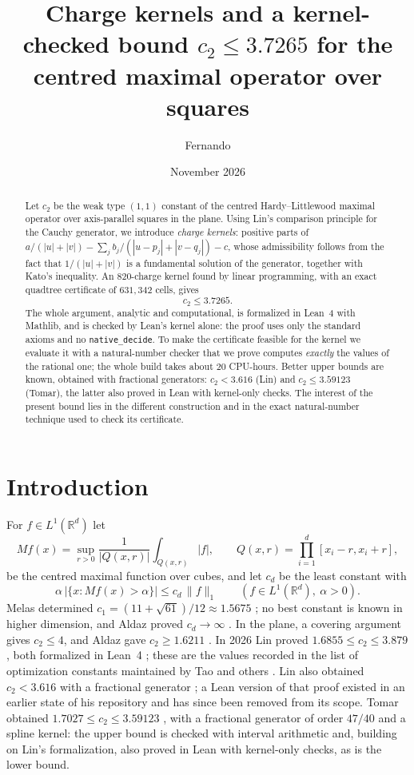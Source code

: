 \documentclass[11pt]{amsart}
\title[A kernel-checked bound for the planar centred maximal constant]{Charge kernels and a kernel-checked
bound $c_2 \le 3.7265$ for the centred maximal operator over squares}
\author{Fernando}
\date{November 2026}
\theoremstyle{definition}
\theoremstyle{remark}
\newcommand{\R}{\mathbb{R}}
\newcommand{\lean}[1]{\texttt{#1}}
\begin{document}
\begin{abstract}
Let $c_2$ be the weak type $(1,1)$ constant of the centred Hardy--Littlewood maximal operator
over axis-parallel squares in the plane. Using Lin's comparison principle for the Cauchy
generator, we introduce \emph{charge kernels}: positive parts of $a/(|u|+|v|) - \sum_j b_j /
(|u-p_j|+|v-q_j|) - c$, whose admissibility follows from the fact that $1/(|u|+|v|)$ is a
fundamental solution of the generator, together with Kato's inequality. An $820$-charge kernel
found by linear programming, with an exact quadtree certificate of $631{,}342$ cells, gives
\[ c_2 \le 3.7265 . \]
The whole argument, analytic and computational, is formalized in Lean~4 with Mathlib, and is
checked by Lean's kernel alone: the proof uses only the standard axioms and no
\lean{native\_decide}. To make the certificate feasible for the kernel we evaluate it with a
natural-number checker that we prove computes \emph{exactly} the values of the rational one; the whole
build takes about $20$ CPU-hours. Better upper bounds are known, obtained with fractional generators:
$c_2 < 3.616$ (Lin) and $c_2 \le 3.59123$ (Tomar), the latter also proved in Lean with kernel-only
checks. The interest of the present bound lies in the different construction and in the exact
natural-number technique used to check its certificate.
\end{abstract}

\maketitle

\section{Introduction}

For $f \in L^1(\R^d)$ let
\[ Mf(x) = \sup_{r>0} \frac{1}{|Q(x,r)|} \int_{Q(x,r)} |f|, \qquad Q(x,r) = \prod_{i=1}^d [x_i - r, x_i + r], \]
be the centred maximal function over cubes, and let $c_d$ be the least constant with
\[ \alpha\, \bigl|\{ x : Mf(x) > \alpha \}\bigr| \le c_d \, \|f\|_1 \qquad (f \in L^1(\R^d),\ \alpha > 0). \]
Melas determined $c_1 = (11+\sqrt{61})/12 \approx 1.5675$ \cite{Melas}; no best constant is known in
higher dimension, and Aldaz proved $c_d \to \infty$ \cite{Aldaz11}. In the plane, a covering
argument gives $c_2 \le 4$, and Aldaz gave $c_2 \ge 1.6211$ \cite{Aldaz00}. In 2026 Lin proved
$1.6855 \le c_2 \le 3.879$, both formalized in Lean~4 \cite{LinRepo}; these are the values recorded in
the list of optimization constants maintained by Tao and others \cite{TaoList}. Lin also obtained
$c_2 < 3.616$ with a fractional generator \cite{LinArticle}; a Lean version of that proof existed in an
earlier state of his repository \cite{LinPB} and has since been removed from its scope. Tomar obtained
$1.7027 \le c_2 \le 3.59123$ \cite{Tomar}, with a fractional generator of order $47/40$ and a spline
kernel: the upper bound is checked with interval arithmetic and, building on Lin's formalization, also
proved in Lean with kernel-only checks, as is the lower bound.
\end{document}
